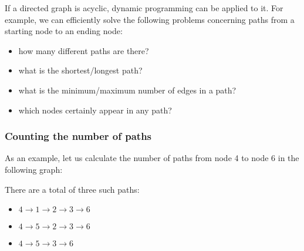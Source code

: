 If a directed graph is acyclic,
dynamic programming can be applied to it.
For example, we can efficiently solve the following
problems concerning paths from a starting node
to an ending node:

\begin{itemize}
\item how many different paths are there?
\item what is the shortest/longest path?
\item what is the minimum/maximum number of edges in a path?
\item which nodes certainly appear in any path?
\end{itemize}

\subsubsection{Counting the number of paths}

As an example, let us calculate the number of paths
from node 4 to node 6 in the following graph:

\begin{center}
\end{center}

There are a total of three such paths:
\begin{itemize}
\item $4 \rightarrow 1 \rightarrow 2 \rightarrow 3 \rightarrow 6$
\item $4 \rightarrow 5 \rightarrow 2 \rightarrow 3 \rightarrow 6$
\item $4 \rightarrow 5 \rightarrow 3 \rightarrow 6$
\end{itemize}

